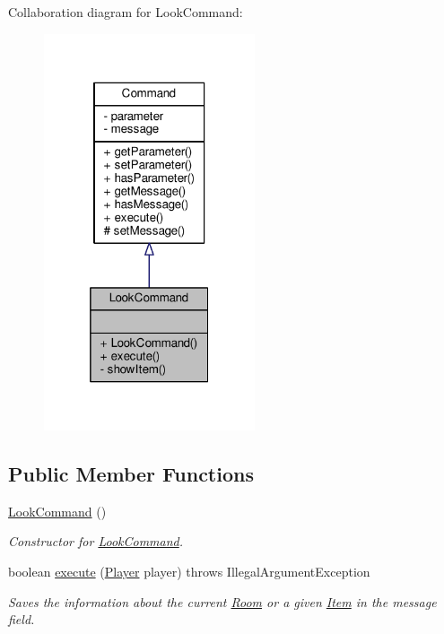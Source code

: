 Collaboration diagram for Look\-Command\-:
\nopagebreak
\begin{figure}[H]
\begin{center}
\leavevmode
\includegraphics[width=176pt]{classLookCommand__coll__graph}
\end{center}
\end{figure}
\subsection*{Public Member Functions}
\begin{DoxyCompactItemize}
\item 
\hyperlink{classLookCommand_a45ae975cf9e99310d630cfe440d5ce75}{Look\-Command} ()
\begin{DoxyCompactList}\small\item\em Constructor for \hyperlink{classLookCommand}{Look\-Command}. \end{DoxyCompactList}\item 
boolean \hyperlink{classLookCommand_a3b67eafb4956b1369904b273303ee7df}{execute} (\hyperlink{classPlayer}{Player} player)  throws Illegal\-Argument\-Exception 
\begin{DoxyCompactList}\small\item\em Saves the information about the current \hyperlink{classRoom}{Room} or a given \hyperlink{classItem}{Item} in the message field. \end{DoxyCompactList}\end{DoxyCompactItemize}

